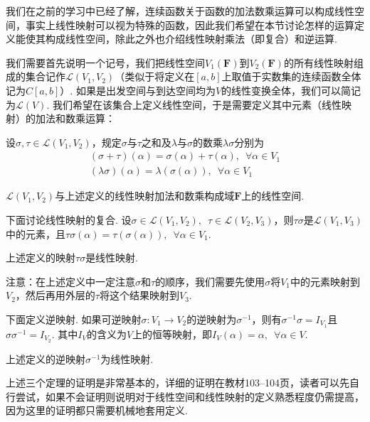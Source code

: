 我们在之前的学习中已经了解，连续函数关于函数的加法数乘运算可以构成线性空间，事实上线性映射可以视为特殊的函数，因此我们希望在本节讨论怎样的运算定义能使其构成线性空间，除此之外也介绍线性映射乘法（即复合）和逆运算.

我们需要首先说明一个记号，我们把线性空间$V_1(\mathbf{F})$到$V_2(\mathbf{F})$的所有线性映射组成的集合记作$\mathcal{L}(V_1,V_2)$（类似于将定义在$[a,b]$上取值于实数集的连续函数全体记为$C[a,b]$）. 如果是出发空间与到达空间均为$V$的线性变换全体，我们可以简记为$\mathcal{L}(V)$. 我们希望在该集合上定义线性空间，于是需要定义其中元素（线性映射）的加法和数乘运算：
\begin{definition}
    设$\sigma,\tau\in \mathcal{L}(V_1,V_2)$，规定$\sigma$与$\tau$之和及$\lambda$与$\sigma$的数乘$\lambda\sigma$分别为
    \begin{gather*}
        (\sigma+\tau)(\alpha)=\sigma(\alpha)+\tau(\alpha),\enspace\forall\alpha\in V_1 \\
        (\lambda\sigma)(\alpha)=\lambda(\sigma(\alpha)),\enspace\forall\alpha\in V_1
    \end{gather*}
\end{definition}

\begin{theorem} \label{thm:5:线性映射全体构成线性空间}
    $\mathcal{L}(V_1,V_2)$与上述定义的线性映射加法和数乘构成域$\mathbf{F}$上的线性空间.
\end{theorem}

下面讨论线性映射的复合. 设$\sigma \in \mathcal{L}(V_1,V_2),\enspace\tau \in \mathcal{L}(V_2,V_3)$，则$\tau\sigma$是$\mathcal{L}(V_1,V_3)$中的元素，且$\tau\sigma(\alpha)=\tau(\sigma(\alpha)),\enspace\forall \alpha \in V_1$.
\begin{theorem}
    上述定义的映射$\tau\sigma$是线性映射.
\end{theorem}
注意：在上述定义中一定注意$\sigma$和$\tau$的顺序，我们需要先使用$\sigma$将$V_1$中的元素映射到$V_2$，然后再用外层的$\tau$将这个结果映射到$V_3$.

下面定义逆映射. 如果可逆映射$\sigma:V_1 \to V_2$的逆映射为$\sigma^{-1}$，则有$\sigma^{-1}\sigma=I_{V_1}$且$\sigma\sigma^{-1}=I_{V_2}$. 其中$I_{V}$的含义为$V$上的恒等映射，即$I_V(\alpha)=\alpha,\enspace \forall \alpha \in V$.
\begin{theorem}
    上述定义的逆映射$\sigma^{-1}$为线性映射.
\end{theorem}

上述三个定理的证明是非常基本的，详细的证明在教材103--104页，读者可以先自行尝试，如果不会证明则说明对于线性空间和线性映射的定义熟悉程度仍需提高，因为这里的证明都只需要机械地套用定义.

